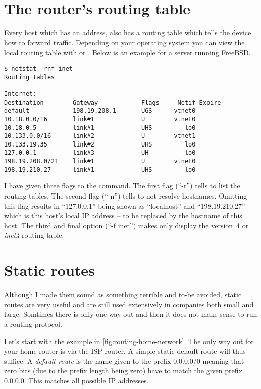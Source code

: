 \section{The router's routing table}

Every host which has an  address, also has a routing table which tells the device how to forward traffic.
Depending on your operating system you can view the local routing table with  or .
Below is an example for a server running FreeBSD.
\begin{verbatim}
$ netstat -rnf inet
Routing tables

Internet:
Destination        Gateway            Flags     Netif Expire
default            198.19.208.1       UGS      vtnet0
10.18.0.0/16       link#1             U        vtnet0
10.18.0.5          link#1             UHS         lo0
10.133.0.0/16      link#2             U        vtnet1
10.133.19.35       link#2             UHS         lo0
127.0.0.1          link#3             UH          lo0
198.19.208.0/21    link#1             U        vtnet0
198.19.210.27      link#1             UHS         lo0
\end{verbatim}
I have given three flags to the command.
The first flag (``-r'') tells  to list the routing tables.
The second flag (``-n'') tells  to not resolve hostnames.
Omitting this flag results in ``127.0.0.1'' being shown as ``localhost'' and ``198.19.210.27'' -- which is this host's local IP address -- to be replaced by the hostname of this host.
The third and final option (``-f inet'') makes  only display the  version~4 or \emph{inet4} routing table.



\section{Static routes}

Although I made them sound as something terrible and to-be avoided, static routes are very useful and are still used extensively in companies both small and large.
Somtimes there is only one way out and then it does not make sense to run a routing protocol.

Let's start with the example in \vref{fig:routing-home-network}.
The only way out for your home router is via the ISP router.
A simple static default route will thus suffice.
A \emph{default route} is the name given to the prefix 0.0.0.0/0 meaning that zero bits (due to the prefix length being zero) have to match the given prefix 0.0.0.0.
This matches all possible IP addresses.


